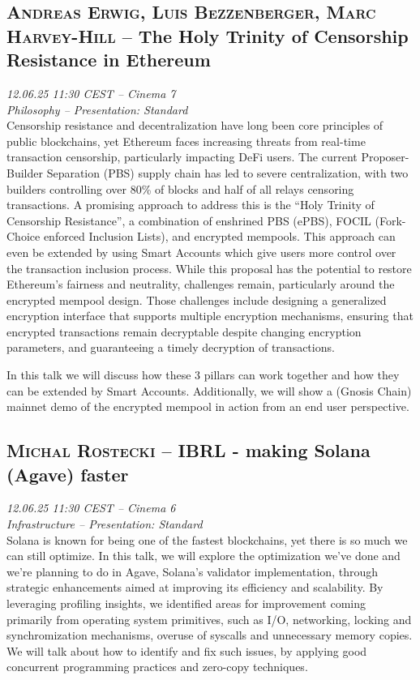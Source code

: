 \subsection {\textsc{Andreas Erwig, Luis Bezzenberger, Marc Harvey-Hill}  -- The Holy Trinity of Censorship Resistance in Ethereum} \noindent \textit {12.06.25 11:30 CEST -- Cinema 7\\ Philosophy -- Presentation: Standard}\\[1em] Censorship resistance and decentralization have long been core principles of public blockchains, yet Ethereum faces increasing threats from real-time transaction censorship, particularly impacting DeFi users. The current Proposer-Builder Separation (PBS) supply chain has led to severe centralization, with two builders controlling over 80\% of blocks and half of all relays censoring transactions. A promising approach to address this is the ``Holy Trinity of Censorship Resistance'', a combination of enshrined PBS (ePBS), FOCIL (Fork-Choice enforced Inclusion Lists), and encrypted mempools. This approach can even be extended by using Smart Accounts which give users more control over the transaction inclusion process. While this proposal has the potential to restore Ethereum’s fairness and neutrality, challenges remain, particularly around the encrypted mempool design. Those challenges include designing a generalized encryption interface that supports multiple encryption mechanisms, ensuring that encrypted transactions remain decryptable despite changing encryption parameters, and guaranteeing a timely decryption of transactions.

In this talk we will discuss how these 3 pillars can work together and how they can be extended by Smart Accounts. Additionally, we will show a (Gnosis Chain) mainnet demo of the encrypted mempool in action from an end user perspective.

\clearpage
\subsection {\textsc{Michal Rostecki}  -- IBRL - making Solana (Agave) faster} \noindent \textit {12.06.25 11:30 CEST -- Cinema 6\\ Infrastructure -- Presentation: Standard}\\[1em] Solana is known for being one of the fastest blockchains, yet there is so much we can still optimize. In this talk, we will explore the optimization we've done and we're planning to do in Agave, Solana's validator implementation, through strategic enhancements aimed at improving its efficiency and scalability. By leveraging profiling insights, we identified areas for improvement coming primarily from operating system primitives, such as I/O, networking, locking and synchromization mechanisms, overuse of syscalls and unnecessary memory copies. We will talk about how to identify and fix such issues, by applying good concurrent programming practices and zero-copy techniques.

